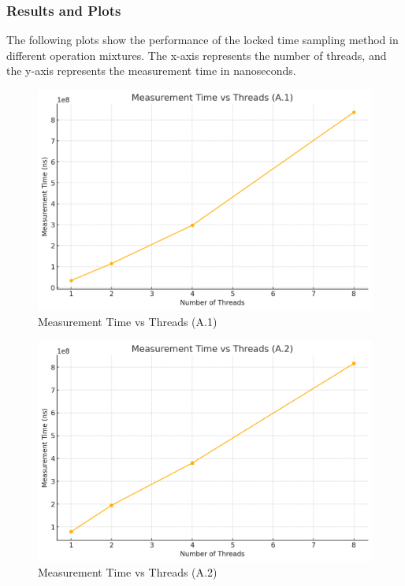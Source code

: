 \documentclass{article}
\begin{document}
\subsubsection{Results and Plots}

The following plots show the performance of the locked time sampling method in different operation mixtures. The x-axis represents the number of threads, and the y-axis represents the measurement time in nanoseconds.

\begin{figure}[H]
    \centering
    \includegraphics[width=\textwidth]{LaTex/images/Lab 3 2.3.2.1.png}
    \caption{Measurement Time vs Threads (A.1)}
    \label{fig:enter-label}
\end{figure}

\begin{figure}[H]
    \centering
    \includegraphics[width=\textwidth]{LaTex/images/Lab 3 2.3.2.2.png}
    \caption{Measurement Time vs Threads (A.2)}
    \label{fig:enter-label}
\end{figure}
\end{document}
